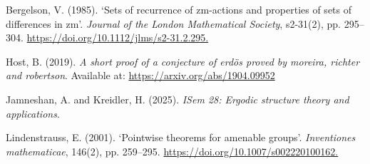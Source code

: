 \documentclass[
  british,
]{article}
\newlength{\cslhangindent}
\newenvironment{CSLReferences}[2] %
 {\begin{list}{}{%
  \setlength{\itemindent}{0pt}
  \setlength{\leftmargin}{0pt}
  \setlength{\parsep}{0pt}
  \ifodd #1
   \setlength{\leftmargin}{\cslhangindent}
   \setlength{\itemindent}{-1\cslhangindent}
  \fi
  \setlength{\itemsep}{#2\baselineskip}}}
 {\end{list}}
\theoremstyle{plain}
\theoremstyle{plain}
\theoremstyle{remark}
\begin{document}
\protect{}\label{refs}
\begin{CSLReferences}{1}{0}
Bergelson, V. (1985). `Sets of recurrence of zm-actions and properties
of sets of differences in zm'. \emph{Journal of the London Mathematical
Society}, s2-31(2), pp. 295--304.
\href{https://doi.org/10.1112/jlms/s2-31.2.295}{https://doi.org/10.1112/jlms/s2-31.2.295.}

Host, B. (2019). \emph{A short proof of a conjecture of erdös proved by
moreira, richter and robertson}. Available at:
\url{https://arxiv.org/abs/1904.09952}

Jamneshan, A. and Kreidler, H. (2025). \emph{ISem 28: Ergodic structure
theory and applications}.

Lindenstrauss, E. (2001). `Pointwise theorems for amenable groups'.
\emph{Inventiones mathematicae}, 146(2), pp. 259--295.
\href{https://doi.org/10.1007/s002220100162}{https://doi.org/10.1007/s002220100162.}

\end{CSLReferences}
\end{document}
